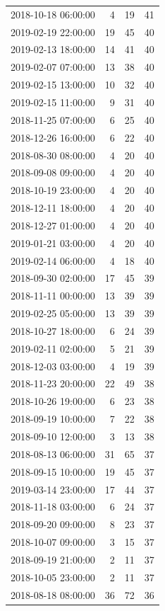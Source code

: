 \begin{tabular}{lrrr}
2018-10-18 06:00:00 & 4 & 19 & 41 \\
2019-02-19 22:00:00 & 19 & 45 & 40 \\
2019-02-13 18:00:00 & 14 & 41 & 40 \\
2019-02-07 07:00:00 & 13 & 38 & 40 \\
2019-02-15 13:00:00 & 10 & 32 & 40 \\
2019-02-15 11:00:00 & 9 & 31 & 40 \\
2018-11-25 07:00:00 & 6 & 25 & 40 \\
2018-12-26 16:00:00 & 6 & 22 & 40 \\
2018-08-30 08:00:00 & 4 & 20 & 40 \\
2018-09-08 09:00:00 & 4 & 20 & 40 \\
2018-10-19 23:00:00 & 4 & 20 & 40 \\
2018-12-11 18:00:00 & 4 & 20 & 40 \\
2018-12-27 01:00:00 & 4 & 20 & 40 \\
2019-01-21 03:00:00 & 4 & 20 & 40 \\
2019-02-14 06:00:00 & 4 & 18 & 40 \\
2018-09-30 02:00:00 & 17 & 45 & 39 \\
2018-11-11 00:00:00 & 13 & 39 & 39 \\
2019-02-25 05:00:00 & 13 & 39 & 39 \\
2018-10-27 18:00:00 & 6 & 24 & 39 \\
2019-02-11 02:00:00 & 5 & 21 & 39 \\
2018-12-03 03:00:00 & 4 & 19 & 39 \\
2018-11-23 20:00:00 & 22 & 49 & 38 \\
2018-10-26 19:00:00 & 6 & 23 & 38 \\
2018-09-19 10:00:00 & 7 & 22 & 38 \\
2018-09-10 12:00:00 & 3 & 13 & 38 \\
2018-08-13 06:00:00 & 31 & 65 & 37 \\
2018-09-15 10:00:00 & 19 & 45 & 37 \\
2019-03-14 23:00:00 & 17 & 44 & 37 \\
2018-11-18 03:00:00 & 6 & 24 & 37 \\
2018-09-20 09:00:00 & 8 & 23 & 37 \\
2018-10-07 09:00:00 & 3 & 15 & 37 \\
2018-09-19 21:00:00 & 2 & 11 & 37 \\
2018-10-05 23:00:00 & 2 & 11 & 37 \\
2018-08-18 08:00:00 & 36 & 72 & 36 \\

\end{tabular}
